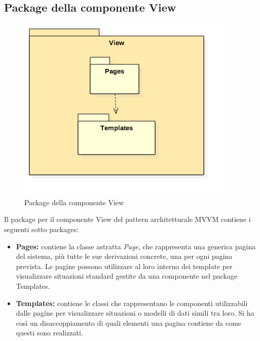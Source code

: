 \subsection{Package della componente View}
	\begin{figure}[h!]
	\begin{center}
		\includegraphics[scale=0.6]{../images/ViewPackage.png}
		\caption{Package della componente View}
	\end{center}
	\end{figure}
	Il package per il componente View del pattern architetturale MVVM contiene i seguenti sotto packages:
	\begin{itemize}
		\item\textbf{Pages:} contiene la classe astratta \textit{Page}, che rappresenta una generica pagina del sistema, più tutte le sue derivazioni concrete, una per ogni pagina prevista. Le pagine possono utilizzare al loro interno dei template per visualizzare situazioni standard gestite da una componente nel package Templates.
		\item\textbf{Templates:} contiene le classi che rappresentano le componenti utilizzabili dalle pagine per visualizzare situazioni o modelli di dati simili tra loro. Si ha così un disaccoppiamento di quali elementi una pagina contiene da come questi sono realizzati.\\
\\
\end{itemize}	